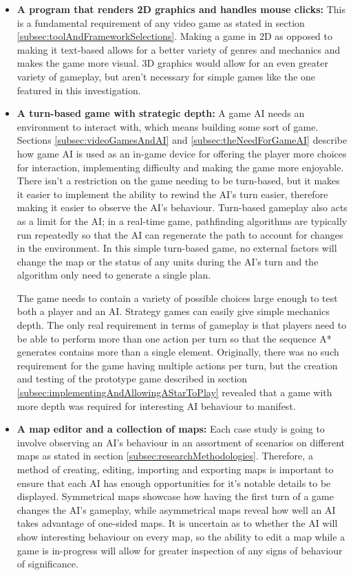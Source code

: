 \documentclass[11pt, a4paper]{report}
\begin{document}
\begin{itemize}

\item \textbf{A program that renders 2D graphics and handles mouse clicks:}
This is a fundamental requirement of any video game as stated in section \ref{subsec:toolAndFrameworkSelections}. Making a game in 2D as opposed to making it text-based allows for a better variety of genres and mechanics and makes the game more visual. 3D graphics would allow for an even greater variety of gameplay, but aren't necessary for simple games like the one featured in this investigation.

\item \textbf{A turn-based game with strategic depth:}
A game AI needs an environment to interact with, which means building some sort of game. Sections \ref{subsec:videoGamesAndAI} and \ref{subsec:theNeedForGameAI} describe how game AI is used as an in-game device for offering the player more choices for interaction, implementing difficulty and making the game more enjoyable. There isn't a restriction on the game needing to be turn-based, but it makes it easier to implement the ability to rewind the AI's turn easier, therefore making it easier to observe the AI's behaviour. Turn-based gameplay also acts as a limit for the AI; in a real-time game, pathfinding algorithms are typically run repeatedly so that the AI can regenerate the path to account for changes in the environment. In this simple turn-based game, no external factors will change the map or the status of any units during the AI's turn and the algorithm only need to generate a single plan.

The game needs to contain a variety of possible choices large enough to test both a player and an AI. Strategy games can easily give simple mechanics depth. The only real requirement in terms of gameplay is that players need to be able to perform more than one action per turn so that the sequence A* generates contains more than a single element. Originally, there was no such requirement for the game having multiple actions per turn, but the creation and testing of the prototype game described in section \ref{subsec:implementingAndAllowingAStarToPlay} revealed that a game with more depth was required for interesting AI behaviour to manifest.

\item \textbf{A map editor and a collection of maps:}
Each case study is going to involve observing an AI's behaviour in an assortment of scenarios on different maps as stated in section \ref{subsec:researchMethodologies}. Therefore, a method of creating, editing, importing and exporting maps is important to ensure that each AI has enough opportunities for it's notable details to be displayed. Symmetrical maps showcase how having the first turn of a game changes the AI's gameplay, while asymmetrical maps reveal how well an AI takes advantage of one-sided maps. It is uncertain as to whether the AI will show interesting behaviour on every map, so the ability to edit a map while a game is in-progress will allow for greater inspection of any signs of behaviour of significance.


\end{itemize}
\end{document}
